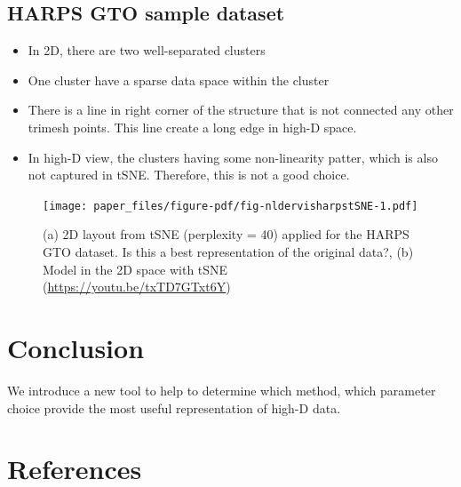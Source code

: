 \documentclass[
  12pt]{article}
\begin{document}
\hypertarget{harps-gto-sample-dataset}{%
\subsection{HARPS GTO sample dataset}\label{harps-gto-sample-dataset}}

\begin{itemize}
\item
  In 2D, there are two well-separated clusters
\item
  One cluster have a sparse data space within the cluster
\item
  There is a line in right corner of the structure that is not connected
  any other trimesh points. This line create a long edge in high-D
  space.
\item
  In high-D view, the clusters having some non-linearity patter, which
  is also not captured in tSNE. Therefore, this is not a good choice.
\end{itemize}

\begin{figure}

{\centering \texttt{[image: paper\_files/figure-pdf/fig-nldervisharpstSNE-1.pdf]}

}

\caption{\label{fig-nldervisharpstSNE}(a) 2D layout from tSNE
(perplexity = 40) applied for the HARPS GTO dataset. Is this a best
representation of the original data?, (b) Model in the 2D space with
tSNE (\url{https://youtu.be/txTD7GTxt6Y})}

\end{figure}

\hypertarget{sec-conclusion}{%
\section{Conclusion}\label{sec-conclusion}}

We introduce a new tool to help to determine which method, which
parameter choice provide the most useful representation of high-D data.

\hypertarget{references}{%
\section*{References}\label{references}}

\renewcommand{\bibsection}{}


\newpage{}
\end{document}
